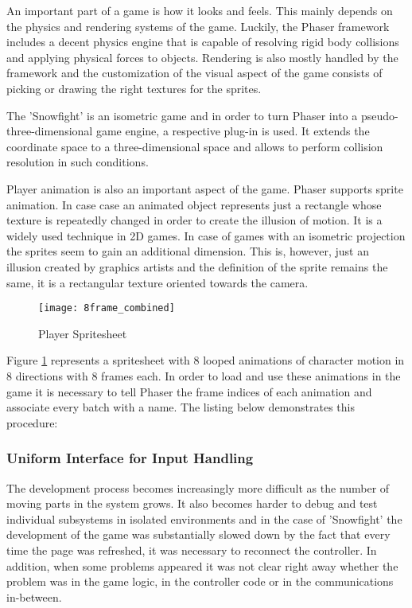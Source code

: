 An important part of a game is how it looks and feels. This mainly depends on
the physics and rendering systems of the game. Luckily, the Phaser framework
includes a decent physics engine that is capable of resolving rigid body
collisions and applying physical forces to objects. Rendering is also mostly
handled by the framework and the customization of the visual aspect of the game
consists of picking or drawing the right textures for the sprites.

The 'Snowfight' is an isometric game and in order to turn Phaser into a pseudo-
three-dimensional game engine, a respective plug-in is used. It extends the
coordinate space to a three-dimensional space and allows to perform collision
resolution in such conditions.



Player animation is also an important aspect of the game. Phaser supports sprite
animation. In case case an animated object represents just a rectangle whose
texture is repeatedly changed in order to create the illusion of motion. It is
a widely used technique in 2D games. In case of games with an isometric
projection the sprites seem to gain an additional dimension. This is, however,
just an illusion created by graphics artists and the definition of the sprite
remains the same, it is a rectangular texture oriented towards the camera.

\begin{figure}[!h]
\centering
\texttt{[image: 8frame\_combined]}
\caption{Player Spritesheet}\label{fig:knight_sprite}
\end{figure}

Figure \ref{fig:knight_sprite} represents a spritesheet with 8 looped animations
of character motion in 8 directions with 8 frames each. In order to load and use
these animations in the game it is necessary to tell Phaser the frame indices of
each animation and associate every batch with a name. The listing below
demonstrates this procedure:



\subsubsection{Uniform Interface for Input Handling}

The development process becomes increasingly more difficult as the number of
moving parts in the system grows. It also becomes harder to debug and test
individual subsystems in isolated environments and in the case of 'Snowfight'
the development of the game was substantially slowed down by the fact that every
time the page was refreshed, it was necessary to reconnect the controller. In
addition, when some problems appeared it was not clear right away whether the
problem was in the game logic, in the controller code or in the communications
in-between.

